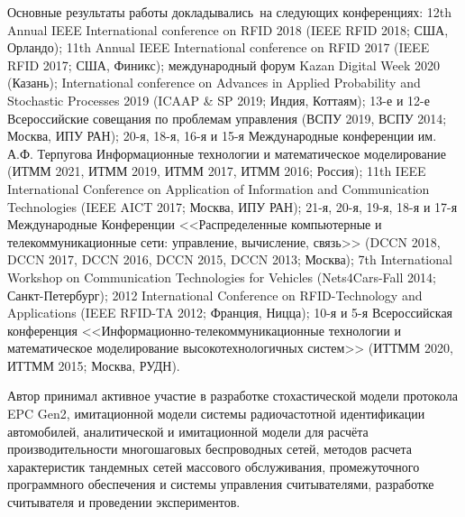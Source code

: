 {\probation}
Основные результаты работы докладывались~на следующих конференциях: 12th Annual IEEE International conference on RFID 2018 (IEEE RFID 2018; США, Орландо); 11th Annual IEEE International conference on RFID 2017 (IEEE RFID 2017; США, Финикс); международный форум Kazan Digital Week 2020 (Казань); International conference on Advances in Applied Probability and Stochastic Processes 2019 (ICAAP \& SP 2019; Индия, Коттаям); 13-е и 12-е Всероссийские совещания по проблемам управления (ВСПУ 2019, ВСПУ 2014; Москва, ИПУ РАН); 20-я, 18-я, 16-я и 15-я Международные конференции им. А.Ф. Терпугова Информационные технологии и математическое моделирование (ИТММ 2021, ИТММ 2019, ИТММ 2017, ИТММ 2016; Россия); 11th IEEE International Conference on Application of Information and Communication Technologies (IEEE AICT 2017; Москва, ИПУ РАН); 21-я, 20-я, 19-я, 18-я и 17-я Международные Конференции <<Распределенные компьютерные и телекоммуникационные сети: управление, вычисление, связь>> (DCCN 2018, DCCN 2017, DCCN 2016, DCCN 2015, DCCN 2013; Москва); 7th International Workshop on Communication Technologies for Vehicles (Nets4Cars-Fall 2014; Санкт-Петербург); 2012 International Conference on RFID-Technology and Applications (IEEE RFID-TA 2012; Франция, Ницца); 10-я и 5-я Всероссийская конференция <<Информационно-телекоммуникационные технологии и математическое моделирование высокотехнологичных систем>> (ИТТММ 2020, ИТТММ 2015; Москва, РУДН).

{\contribution} Автор принимал активное участие в разработке стохастической модели протокола EPC Gen2, имитационной модели системы радиочастотной идентификации автомобилей, аналитической и имитационной модели для расчёта производительности многошаговых беспроводных сетей, методов расчета характеристик тандемных сетей массового обслуживания, промежуточного программного обеспечения и системы управления считывателями, разработке считывателя и проведении экспериментов.

